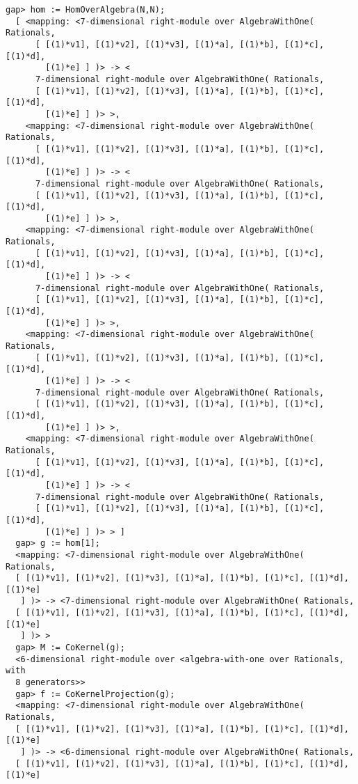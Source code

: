 \documentclass[a4paper,11pt]{report}
\begin{document}
{{ 
\begin{Verbatim}[fontsize=\small,frame=single,label=Example]
  gap> hom := HomOverAlgebra(N,N);
  [ <mapping: <7-dimensional right-module over AlgebraWithOne( Rationals, 
      [ [(1)*v1], [(1)*v2], [(1)*v3], [(1)*a], [(1)*b], [(1)*c], [(1)*d], 
        [(1)*e] ] )> -> <
      7-dimensional right-module over AlgebraWithOne( Rationals, 
      [ [(1)*v1], [(1)*v2], [(1)*v3], [(1)*a], [(1)*b], [(1)*c], [(1)*d], 
        [(1)*e] ] )> >, 
    <mapping: <7-dimensional right-module over AlgebraWithOne( Rationals, 
      [ [(1)*v1], [(1)*v2], [(1)*v3], [(1)*a], [(1)*b], [(1)*c], [(1)*d], 
        [(1)*e] ] )> -> <
      7-dimensional right-module over AlgebraWithOne( Rationals, 
      [ [(1)*v1], [(1)*v2], [(1)*v3], [(1)*a], [(1)*b], [(1)*c], [(1)*d], 
        [(1)*e] ] )> >, 
    <mapping: <7-dimensional right-module over AlgebraWithOne( Rationals, 
      [ [(1)*v1], [(1)*v2], [(1)*v3], [(1)*a], [(1)*b], [(1)*c], [(1)*d], 
        [(1)*e] ] )> -> <
      7-dimensional right-module over AlgebraWithOne( Rationals, 
      [ [(1)*v1], [(1)*v2], [(1)*v3], [(1)*a], [(1)*b], [(1)*c], [(1)*d], 
        [(1)*e] ] )> >, 
    <mapping: <7-dimensional right-module over AlgebraWithOne( Rationals, 
      [ [(1)*v1], [(1)*v2], [(1)*v3], [(1)*a], [(1)*b], [(1)*c], [(1)*d], 
        [(1)*e] ] )> -> <
      7-dimensional right-module over AlgebraWithOne( Rationals, 
      [ [(1)*v1], [(1)*v2], [(1)*v3], [(1)*a], [(1)*b], [(1)*c], [(1)*d], 
        [(1)*e] ] )> >, 
    <mapping: <7-dimensional right-module over AlgebraWithOne( Rationals, 
      [ [(1)*v1], [(1)*v2], [(1)*v3], [(1)*a], [(1)*b], [(1)*c], [(1)*d], 
        [(1)*e] ] )> -> <
      7-dimensional right-module over AlgebraWithOne( Rationals, 
      [ [(1)*v1], [(1)*v2], [(1)*v3], [(1)*a], [(1)*b], [(1)*c], [(1)*d], 
        [(1)*e] ] )> > ]
  gap> g := hom[1];
  <mapping: <7-dimensional right-module over AlgebraWithOne( Rationals, 
  [ [(1)*v1], [(1)*v2], [(1)*v3], [(1)*a], [(1)*b], [(1)*c], [(1)*d], [(1)*e] 
   ] )> -> <7-dimensional right-module over AlgebraWithOne( Rationals, 
  [ [(1)*v1], [(1)*v2], [(1)*v3], [(1)*a], [(1)*b], [(1)*c], [(1)*d], [(1)*e] 
   ] )> >
  gap> M := CoKernel(g);
  <6-dimensional right-module over <algebra-with-one over Rationals, with 
  8 generators>>
  gap> f := CoKernelProjection(g);
  <mapping: <7-dimensional right-module over AlgebraWithOne( Rationals, 
  [ [(1)*v1], [(1)*v2], [(1)*v3], [(1)*a], [(1)*b], [(1)*c], [(1)*d], [(1)*e] 
   ] )> -> <6-dimensional right-module over AlgebraWithOne( Rationals, 
  [ [(1)*v1], [(1)*v2], [(1)*v3], [(1)*a], [(1)*b], [(1)*c], [(1)*d], [(1)*e] 

\end{Verbatim}}}
\end{document}
